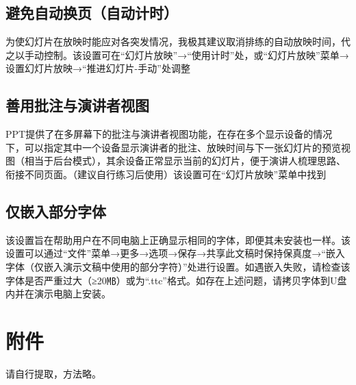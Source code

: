\subsection[避免自动换页（自动计时）]{避免自动换页（自动计时）}
为使幻灯片在放映时能应对各突发情况，我极其建议取消排练的自动放映时间，代之以手动控制。该设置可在“幻灯片放映”→“使用计时”处，或“幻灯片放映”菜单→设置幻灯片放映→“推进幻灯片-手动”处调整

\subsection[善用批注与演讲者视图]{善用批注与演讲者视图}
PPT提供了在多屏幕下的批注与演讲者视图功能，在存在多个显示设备的情况下，可以指定其中一个设备显示演讲者的批注、放映时间与下一张幻灯片的预览视图（相当于后台模式），其余设备正常显示当前的幻灯片，便于演讲人梳理思路、衔接不同页面。（建议自行练习后使用）该设置可在“幻灯片放映”菜单中找到

\subsection[仅嵌入部分字体]{仅嵌入部分字体}
该设置旨在帮助用户在不同电脑上正确显示相同的字体，即便其未安装也一样。该设置可以通过“文件”菜单→更多→选项→保存→共享此文稿时保持保真度→“嵌入字体（仅嵌入演示文稿中使用的部分字符）”处进行设置。如遇嵌入失败，请检查该字体是否严重过大（≥20㎆）或为“.ttc”格式。如存在上述问题，请拷贝字体到U盘内并在演示电脑上安装。

\section[附件]{附件}
请自行提取，方法略。

